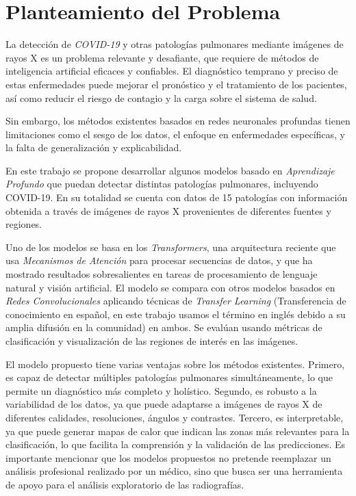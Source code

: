 \section{Planteamiento del Problema}

La detección de \textit{COVID-19} y otras patologías pulmonares mediante imágenes de rayos X es un
problema relevante y desafiante, que requiere de métodos de inteligencia artificial eficaces y confiables.
El diagnóstico temprano y preciso de estas enfermedades puede mejorar el pronóstico y el tratamiento
de los pacientes, así como reducir el riesgo de contagio y la carga sobre el sistema de salud.

Sin embargo, los métodos existentes basados en redes neuronales profundas tienen limitaciones como
el sesgo de los datos, el enfoque en enfermedades específicas, y la falta de generalización y
explicabilidad.

En este trabajo se propone desarrollar algunos modelos basado en \textit{Aprendizaje Profundo} que
puedan detectar distintas patologías pulmonares, incluyendo COVID-19. En su totalidad se cuenta con
datos de 15 patologías con información obtenida a través de imágenes de rayos X provenientes de
diferentes fuentes y regiones.

Uno de los modelos se basa en los \textit{Transformers}, una arquitectura reciente que usa
\textit{Mecanismos de Atención} para procesar secuencias de datos, y que ha mostrado resultados
sobresalientes en tareas de procesamiento de lenguaje natural y visión artificial.
El modelo se compara con otros modelos basados en \textit{Redes Convolucionales} aplicando
técnicas de \emph{Transfer Learning} (Transferencia de conocimiento en español, en este trabajo
usamos el término en inglés debido a su amplia difusión en la comunidad) en ambos. Se evalúan usando
métricas de clasificación y visualización de las regiones de interés en las imágenes.

El modelo propuesto tiene varias ventajas sobre los métodos existentes. Primero, es capaz de
detectar múltiples patologías pulmonares simultáneamente, lo que permite un diagnóstico más
completo y holístico. Segundo, es robusto a la variabilidad de los datos, ya que puede adaptarse a
imágenes de rayos X de diferentes calidades, resoluciones, ángulos y contrastes.
Tercero, es interpretable, ya que puede generar mapas de calor que indican las zonas más relevantes
para la clasificación, lo que facilita la comprensión y la validación de las predicciones. Es
importante mencionar que los modelos propuestos no pretende reemplazar un análisis profesional
realizado por un médico, sino que busca ser una herramienta de apoyo para el análisis exploratorio
de las radiografías.

